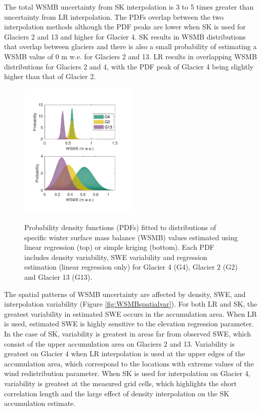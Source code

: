 \documentclass[twocolumn,letterpaper]{igs}
\begin{document}
The total WSMB uncertainty from SK interpolation is 3 to 5 times greater than uncertainty from LR interpolation. The PDFs overlap between the two interpolation methods although the PDF peaks are lower when SK is used for Glaciers 2 and 13 and higher for Glacier 4. SK results in WSMB distributions that overlap between glaciers and there is also a small probability of estimating a WSMB value of 0 m w.e. for Glaciers 2 and 13. LR results in overlapping WSMB distributions for Glaciers 2 and 4, with the PDF peak of Glacier 4 being slightly higher than that of Glacier 2. 

\begin{figure}
	\centering
	\includegraphics[width =0.5\textwidth]{WSMBDist_full.pdf}\\
	\caption{Probability density functions (PDFs) fitted to distributions of specific winter surface mass balance (WSMB) values estimated using linear regression (top) or simple kriging (bottom). Each PDF includes density variability, SWE variability and regression estimation (linear regression only) for Glacier 4 (G4), Glacier 2 (G2) and Glacier 13 (G13).}
	\label{fig:WSMBDist_LRvsSK}
\end{figure}


The spatial patterns of WSMB uncertainty are affected by density, SWE, and interpolation variability (Figure \ref{fig:WSMBspatialvar}).  For both LR and SK, the greatest variability in estimated SWE occurs in the accumulation area. When LR is used, estimated SWE is highly sensitive to the elevation regression parameter. In the case of SK, variability is greatest in areas far from observed SWE, which consist of the upper accumulation area on Glaciers 2 and 13. Variability is greatest on Glacier 4 when LR interpolation is used at the upper edges of the accumulation area, which correspond to the locations with extreme values of the wind redistribution parameter. When SK is used for interpolation on Glacier 4, variability is greatest at the measured grid cells, which highlights the short correlation length and the large effect of density interpolation on the SK accumulation estimate.
\end{document}
